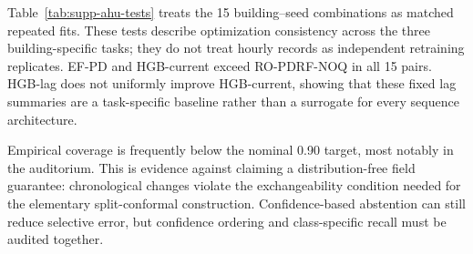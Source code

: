 \documentclass[10pt]{article}
\begin{document}
\begin{table}[ht]
\centering
\caption{Recall for the two native expert-annotated fault subtypes. The class counts in Table~\ref{tab:supp-ahu-distribution} govern interpretation, especially for the eight hospital supply-air faults.}
\label{tab:supp-ahu-subtypes}
\resizebox{0.86\textwidth}{!}{}
\end{table}

\begin{table}[ht]
\centering
\caption{Confusion counts for fixed five-member probability ensembles on the untouched chronological test periods. Either native sensor-fault subtype is positive.}
\label{tab:supp-ahu-confusion}
\resizebox{0.76\textwidth}{!}{}
\end{table}

Table~\ref{tab:supp-ahu-tests} treats the 15 building--seed combinations as matched repeated fits. These tests describe optimization consistency across the three building-specific tasks; they do not treat hourly records as independent retraining replicates. EF-PD and HGB-current exceed RO-PDRF-NOQ in all 15 pairs. HGB-lag does not uniformly improve HGB-current, showing that these fixed lag summaries are a task-specific baseline rather than a surrogate for every sequence architecture.

\begin{table}[ht]
\centering
\caption{Paired AHU macro-AUROC contrasts for RO-PDRF-NOQ across five seeds and three buildings.}
\label{tab:supp-ahu-tests}
\resizebox{0.72\textwidth}{!}{}
\end{table}

\begin{table}[ht]
\centering
\caption{Split-conformal diagnostics at nominal error level $\alpha=0.10$. Calibration uses the chronological calibration interval and evaluation uses the later test interval.}
\label{tab:supp-ahu-conformal}
\resizebox{\textwidth}{!}{}
\end{table}

Empirical coverage is frequently below the nominal 0.90 target, most notably in the auditorium. This is evidence against claiming a distribution-free field guarantee: chronological changes violate the exchangeability condition needed for the elementary split-conformal construction. Confidence-based abstention can still reduce selective error, but confidence ordering and class-specific recall must be audited together.
\end{document}
